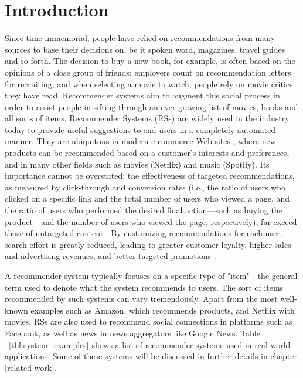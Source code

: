\documentclass[cic,tc,english]{iiufrgs}
\begin{document}



\chapter{Introduction} \label{introduction}
Since time immemorial, people have relied on recommendations from many sources to base their decisions on, be it spoken word, magazines, travel guides and so forth. The decision to buy a new book, for example, is often based on the opinions of a close group of friends; employers count on recommendation letters for recruiting; and when selecting a movie to watch, people rely on movie critics they have read. Recommender systems aim to augment this social process in order to assist people in sifting through an ever-growing list of movies, books and all sorts of items. Recommender Systems (RSs) are widely used in the industry today to provide useful suggestions to end-users in a completely automated manner. They are ubiquitous in modern e-commerce Web sites \cite{Schafer2001}, where new products can be recommended based on a customer's interests and preferences, and in many other fields such as movies (Netflix) and music (Spotify). Its importance cannot be overstated: the effectiveness of targeted recommendations, as measured by click-through and conversion rates (i.e., the ratio of users who clicked on a specific link and the total number of users who viewed a page, and the ratio of users who performed the desired final action---such as buying the product---and the number of users who viewed the page, respectively), far exceed those of untargeted content \cite{Linden2003}. By customizing recommendations for each user, search effort is greatly reduced, leading to greater customer loyalty, higher sales and advertising revenues, and better targeted promotions \cite{Ansari2000}.

A recommender system typically focuses on a specific type of "item"---the general term used to denote what the system recommends to users. The sort of items recommended by such systems can vary tremendously. Apart from the most well-known examples such as Amazon, which recommends products, and Netflix with movies, RSs are also used to recommend social connections in platforms such as Facebook, as well as news in news aggregators like Google News. Table ~\ref{tbl:system_examples} shows a list of recommender systems used in real-world applications. Some of these systems will be discussed in further details in chapter \ref{related-work}.
\end{document}
